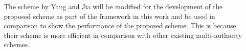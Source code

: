 The scheme by Yang and Jia \cite{Yang2014} will be modified for the development of the proposed scheme as part of the framework in this work and be used in comparison to show the performance of the proposed scheme. This is because their scheme is more efficient in comparison with other existing multi-authority schemes.





